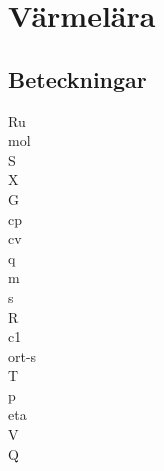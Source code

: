 \chapter{Värmelära}
\section*{Beteckningar}
\acrfull{Ru}\\
\acrfull{mol}\\
\acrfull{S}\\
\acrfull{X}\\
\acrfull{G}\\
\acrfull{cp}\\
\acrfull{cv}\\
\acrfull{q}\\
\acrfull{m}\\
\acrfull{s}\\
\acrfull{R}\\
\acrfull{c1}\\
\acrfull{ort-s}\\
\acrfull{T}\\
\acrfull{p}\\
\acrfull{eta}\\
\acrfull{V}\\
\acrfull{Q}

